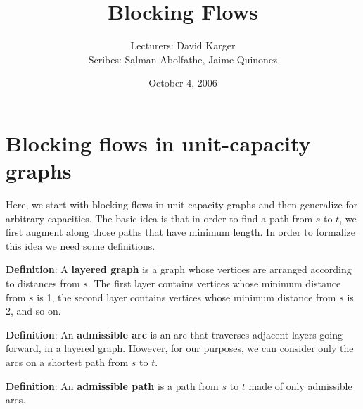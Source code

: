 \documentclass{article}
\title{Blocking Flows}
\date{October 4, 2006}
\author{Lecturers: David Karger\\ Scribes: Salman Abolfathe, Jaime Quinonez}
\begin{document}
%
%
%
%

%



\section{ Blocking flows in unit-capacity graphs}

Here, we start with blocking flows in unit-capacity graphs and
then generalize for arbitrary capacities. The basic idea is that in order to
find a path from $s$ to $t$, we first augment along those paths that
have minimum length. In order to formalize this idea we need some
definitions.

\textbf{Definition}:
A {\bf layered graph} is a graph whose vertices are arranged according to distances from $s$.  The first layer contains vertices whose minimum distance from $s$ is 1, the second layer contains vertices whose minimum distance from $s$ is 2, and so on.

\textbf{Definition}:
An {\bf admissible arc} is an arc that traverses adjacent layers going forward, in a layered graph.  However, for our purposes, we can consider only the arcs on a shortest path from $s$ to $t$.

\textbf{Definition}:
An {\bf admissible path} is a path from $s$ to $t$ made of only admissible
arcs.
\end{document}
